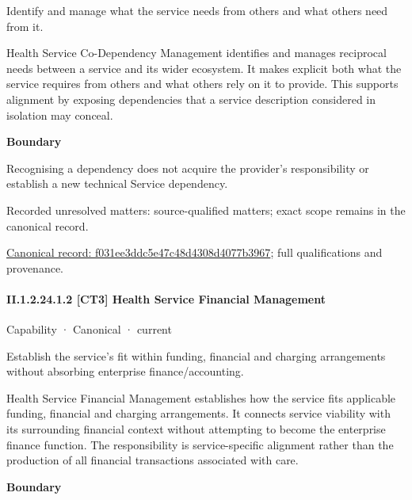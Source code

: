 Identify and manage what the service needs from others and what others need from it.



Health Service Co-Dependency Management identifies and manages reciprocal needs between a service and its wider ecosystem. It makes explicit both what the service requires from others and what others rely on it to provide. This supports alignment by exposing dependencies that a service description considered in isolation may conceal.



\textbf{Boundary}



Recognising a dependency does not acquire the provider's responsibility or establish a new technical Service dependency.


{\small Recorded unresolved matters: source-qualified matters; exact scope remains in the canonical record.}\par
{\footnotesize \href{../../../../continuum/strategy/capability/f031ee3ddc5e47c48d4308d4077b3967.md}{Canonical record: f031ee3ddc5e47c48d4308d4077b3967}; full qualifications and provenance.}\par
\paragraph*{II.1.2.24.1.2 [CT3] Health Service Financial Management}
\label{navigation:II.1.2.24.1.2}

\label{element:2fbf31e974574f288f087179e4023dc2}
{\small Capability · Canonical · current}\par

Establish the service’s fit within funding, financial and charging arrangements without absorbing enterprise finance/accounting.



Health Service Financial Management establishes how the service fits applicable funding, financial and charging arrangements. It connects service viability with its surrounding financial context without attempting to become the enterprise finance function. The responsibility is service-specific alignment rather than the production of all financial transactions associated with care.



\textbf{Boundary}




